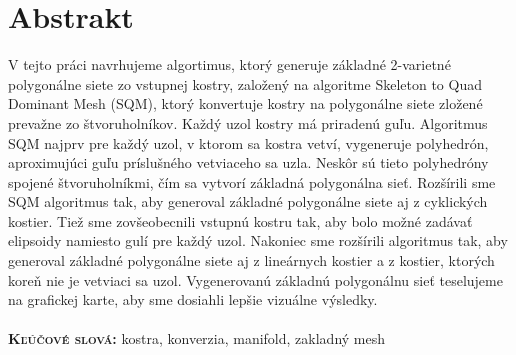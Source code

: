 \chapter{Abstrakt}
V tejto práci navrhujeme algortimus, ktorý generuje základné 2-varietné polygonálne siete zo vstupnej kostry, založený na algoritme Skeleton to Quad Dominant Mesh (SQM), ktorý konvertuje kostry na polygonálne siete zložené prevažne zo štvoruholníkov.
Každý uzol kostry má priradenú guľu.
Algoritmus SQM najprv pre každý uzol, v ktorom sa kostra vetví, vygeneruje polyhedrón, aproximujúci guľu príslušného vetviaceho sa uzla.
Neskôr sú tieto polyhedróny spojené štvoruholníkmi, čím sa vytvorí základná polygonálna sieť.
Rozšírili sme SQM algoritmus tak, aby generoval základné polygonálne siete aj z cyklických kostier.
Tiež sme zovšeobecnili vstupnú kostru tak, aby bolo možné zadávať elipsoidy namiesto gulí pre každý uzol.
Nakoniec sme rozšírili algoritmus tak, aby generoval základné polygonálne siete aj z lineárnych kostier a z kostier, ktorých koreň nie je vetviaci sa uzol.
Vygenerovanú základnú polygonálnu sieť teselujeme na grafickej karte, aby sme dosiahli lepšie vizuálne výsledky.
\\ \\
\textbf{\textsc{Kľúčové slová:}} kostra, konverzia, manifold, zakladný mesh